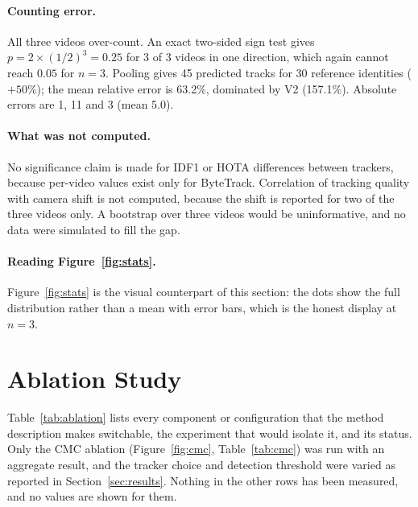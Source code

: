 \documentclass[11pt,a4paper]{article}
\begin{document}
\paragraph{Counting error.} All three videos over-count. An exact two-sided sign test gives $p=2\times(1/2)^3=0.25$ for 3 of 3 videos in one direction, which again cannot reach $0.05$ for $n=3$. Pooling gives 45 predicted tracks for 30 reference identities ($+50\%$); the mean relative error is 63.2\%, dominated by V2 (157.1\%). Absolute errors are 1, 11 and 3 (mean 5.0).

\paragraph{What was not computed.} No significance claim is made for IDF1 or HOTA differences between trackers, because per-video values exist only for ByteTrack. Correlation of tracking quality with camera shift is not computed, because the shift is reported for two of the three videos only. A bootstrap over three videos would be uninformative, and no data were simulated to fill the gap.

\paragraph{Reading Figure~\ref{fig:stats}.} Figure~\ref{fig:stats} is the visual counterpart of this section: the dots show the full distribution rather than a mean with error bars, which is the honest display at $n=3$.

\section{Ablation Study}\label{sec:ablation}

Table~\ref{tab:ablation} lists every component or configuration that the method description makes switchable, the experiment that would isolate it, and its status. Only the CMC ablation (Figure~\ref{fig:cmc}, Table~\ref{tab:cmc}) was run with an aggregate result, and the tracker choice and detection threshold were varied as reported in Section~\ref{sec:results}. Nothing in the other rows has been measured, and no values are shown for them.
\end{document}
